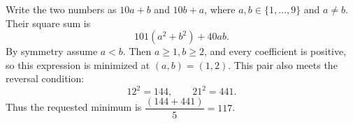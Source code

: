 Write the two numbers as $10a+b$ and $10b+a$, where $a,b\in\{1,\ldots,9\}$ and $a\ne b$. Their square sum is
\[
101(a^2+b^2)+40ab.
\]
By symmetry assume $a<b$. Then $a\ge1,b\ge2$, and every coefficient is positive, so this expression is minimized at $(a,b)=(1,2)$. This pair also meets the reversal condition:
\[
12^2=144,\qquad21^2=441.
\]
Thus the requested minimum is $\boxed{\dfrac{(144+441)}{5}=117}$.

